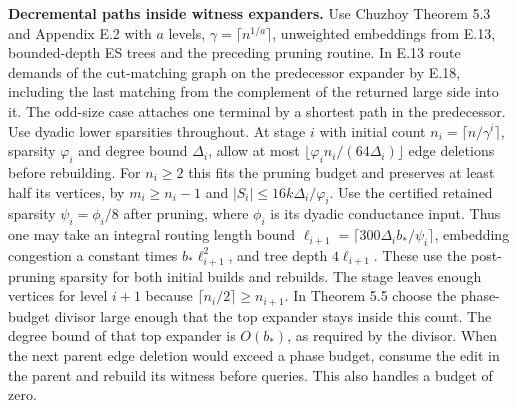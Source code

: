 \documentclass[11pt]{article}
\begin{document}
\begin{itemize}
  \textbf{Decremental paths inside witness expanders.} Use Chuzhoy Theorem 5.3 and Appendix E.2 with \(a\) levels, \(\gamma=\lceil n^{1/a}\rceil\), unweighted embeddings from E.13, bounded-depth ES trees and the preceding pruning routine. In E.13 route demands of the cut-matching graph on the predecessor expander by E.18, including the last matching from the complement of the returned large side into it. The odd-size case attaches one terminal by a shortest path in the predecessor. Use dyadic lower sparsities throughout. At stage \(i\) with initial count \(n_i=\lceil n/\gamma^i\rceil\), sparsity \(\varphi_i\) and degree bound \(\Delta_i\), allow at most \(\lfloor \varphi_i n_i/(64\Delta_i)\rfloor\) edge deletions before rebuilding. For \(n_i\ge2\) this fits the pruning budget and preserves at least half its vertices, by \(m_i\ge n_i-1\) and \(|S_i|\le16k\Delta_i/\varphi_i\). Use the certified retained sparsity \(\psi_i=\phi_i/8\) after pruning, where \(\phi_i\) is its dyadic conductance input. Thus one may take an integral routing length bound \(\ell_{i+1}=\lceil300\Delta_i b_*/\psi_i\rceil\), embedding congestion a constant times \(b_*\ell_{i+1}^2\), and tree depth \(4\ell_{i+1}\). These use the post-pruning sparsity for both initial builds and rebuilds. The stage leaves enough vertices for level \(i+1\) because \(\lceil n_i/2\rceil\ge n_{i+1}\). In Theorem 5.5 choose the phase-budget divisor large enough that the top expander stays inside this count. The degree bound of that top expander is \(O(b_*)\), as required by the divisor. When the next parent edge deletion would exceed a phase budget, consume the edit in the parent and rebuild its witness before queries. This also handles a budget of zero.


\end{itemize}
\end{document}
